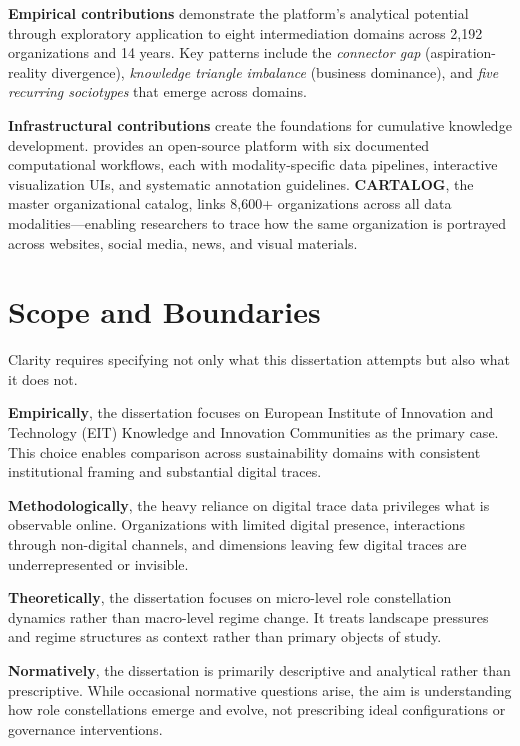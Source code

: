 \documentclass[../main.tex]{subfiles}
\begin{document}
\textbf{Empirical contributions} demonstrate the platform's analytical potential through exploratory application to eight intermediation domains across 2,192 organizations and 14 years. Key patterns include the \emph{connector gap} (aspiration-reality divergence), \emph{knowledge triangle imbalance} (business dominance), and \emph{five recurring sociotypes} that emerge across domains.

\textbf{Infrastructural contributions} create the foundations for cumulative knowledge development. \RoleBox{} provides an open-source platform with six documented computational workflows, each with modality-specific data pipelines, interactive visualization UIs, and systematic annotation guidelines. \textbf{CARTALOG}, the master organizational catalog, links 8,600+ organizations across all data modalities---enabling researchers to trace how the same organization is portrayed across websites, social media, news, and visual materials.


\section{Scope and Boundaries}
\label{sec:intro:scope}

Clarity requires specifying not only what this dissertation attempts but also what it does not.

\textbf{Empirically}, the dissertation focuses on European Institute of Innovation and Technology (EIT) Knowledge and Innovation Communities as the primary case. This choice enables comparison across sustainability domains with consistent institutional framing and substantial digital traces.

\textbf{Methodologically}, the heavy reliance on digital trace data privileges what is observable online. Organizations with limited digital presence, interactions through non-digital channels, and dimensions leaving few digital traces are underrepresented or invisible.

\textbf{Theoretically}, the dissertation focuses on micro-level role constellation dynamics rather than macro-level regime change. It treats landscape pressures and regime structures as context rather than primary objects of study.

\textbf{Normatively}, the dissertation is primarily descriptive and analytical rather than prescriptive. While occasional normative questions arise, the aim is understanding how role constellations emerge and evolve, not prescribing ideal configurations or governance interventions.
\end{document}
